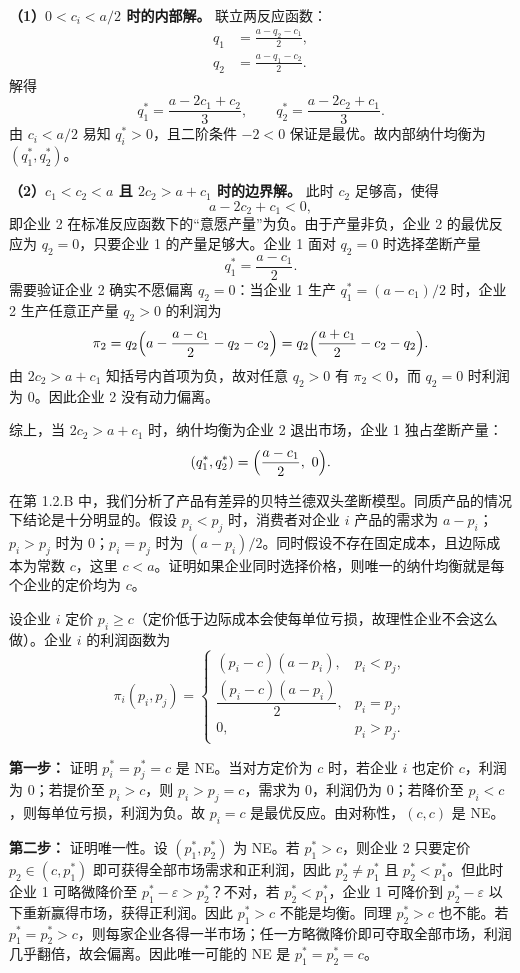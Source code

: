\textbf{（1）$0<c_i<a/2$ 时的内部解。} 联立两反应函数：
\begin{align*}
  q_1&=\frac{a-q_2-c_1}{2},\\
  q_2&=\frac{a-q_1-c_2}{2}.
\end{align*}\indent
解得
\[
  \boxed{q_1^*=\frac{a-2c_1+c_2}{3},\qquad q_2^*=\frac{a-2c_2+c_1}{3}}.
\]\indent
由 $c_i<a/2$ 易知 $q_i^*>0$，且二阶条件 $-2<0$ 保证是最优。故内部纳什均衡为 $(q_1^*,q_2^*)$。

\textbf{（2）$c_1<c_2<a$ 且 $2c_2>a+c_1$ 时的边界解。} 此时 $c_2$ 足够高，使得
\[
  a-2c_2+c_1<0,
\]\indent
即企业 2 在标准反应函数下的“意愿产量”为负。由于产量非负，企业 2 的最优反应为 $q_2=0$，只要企业 1 的产量足够大。企业 1 面对 $q_2=0$ 时选择垄断产量
\[
  q_1^*=\frac{a-c_1}{2}.
\]\indent
需要验证企业 2 确实不愿偏离 $q_2=0$：当企业 1 生产 $q_1^*=(a-c_1)/2$ 时，企业 2 生产任意正产量 $q_2>0$ 的利润为
\[
  \pi_2=q_2\Bigl(a-\frac{a-c_1}{2}-q_2-c_2\Bigr)
       =q_2\Bigl(\frac{a+c_1}{2}-c_2-q_2\Bigr).
\]\indent
由 $2c_2>a+c_1$ 知括号内首项为负，故对任意 $q_2>0$ 有 $\pi_2<0$，而 $q_2=0$ 时利润为 0。因此企业 2 没有动力偏离。

综上，当 $2c_2>a+c_1$ 时，纳什均衡为企业 2 退出市场，企业 1 独占垄断产量：
\[
  \boxed{(q_1^*,q_2^*)=\Bigl(\frac{a-c_1}{2},\ 0\Bigr)}.
\]

在第 1.2.B 中，我们分析了产品有差异的贝特兰德双头垄断模型。同质产品的情况下结论是十分明显的。假设 $p_i<p_j$ 时，消费者对企业 $i$ 产品的需求为 $a-p_i$；$p_i>p_j$ 时为 $0$；$p_i=p_j$ 时为 $(a-p_i)/2$。同时假设不存在固定成本，且边际成本为常数 $c$，这里 $c<a$。证明如果企业同时选择价格，则唯一的纳什均衡就是每个企业的定价均为 $c$。

\sol
设企业 $i$ 定价 $p_i\ge c$（定价低于边际成本会使每单位亏损，故理性企业不会这么做）。企业 $i$ 的利润函数为
\[
  \pi_i(p_i,p_j)=\begin{cases}
    (p_i-c)(a-p_i), & p_i<p_j,\\[6pt]
    \dfrac{(p_i-c)(a-p_i)}{2}, & p_i=p_j,\\[10pt]
    0, & p_i>p_j.
\end{cases}
\]

\textbf{第一步：} 证明 $p_i^*=p_j^*=c$ 是 NE。当对方定价为 $c$ 时，若企业 $i$ 也定价 $c$，利润为 0；若提价至 $p_i>c$，则 $p_i>p_j=c$，需求为 0，利润仍为 0；若降价至 $p_i<c$，则每单位亏损，利润为负。故 $p_i=c$ 是最优反应。由对称性，$(c,c)$ 是 NE。

\textbf{第二步：} 证明唯一性。设 $(p_1^*,p_2^*)$ 为 NE。若 $p_1^*>c$，则企业 2 只要定价 $p_2\in(c,p_1^*)$ 即可获得全部市场需求和正利润，因此 $p_2^*\ne p_1^*$ 且 $p_2^*<p_1^*$。但此时企业 1 可略微降价至 $p_1^*-\varepsilon>p_2^*$？不对，若 $p_2^*<p_1^*$，企业 1 可降价到 $p_2^*-\varepsilon$ 以下重新赢得市场，获得正利润。因此 $p_1^*>c$ 不能是均衡。同理 $p_2^*>c$ 也不能。若 $p_1^*=p_2^*>c$，则每家企业各得一半市场；任一方略微降价即可夺取全部市场，利润几乎翻倍，故会偏离。因此唯一可能的 NE 是 $p_1^*=p_2^*=c$。

